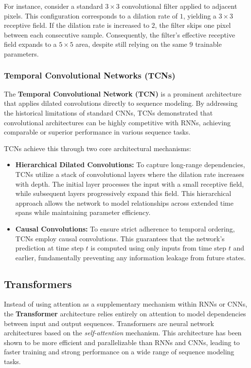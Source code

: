 For instance, consider a standard $3 \times 3$ convolutional filter applied to adjacent pixels. This configuration corresponds to a dilation rate of $1$, yielding a $3 \times 3$ receptive field. 
If the dilation rate is increased to $2$, the filter skips one pixel between each consecutive sample. Consequently, the filter's effective receptive field expands to a $5 \times 5$ area, despite still relying on the same $9$ trainable parameters.

\subsubsection{Temporal Convolutional Networks (TCNs)}
The \textbf{Temporal Convolutional Network (TCN)} is a prominent architecture that applies dilated convolutions directly to sequence modeling. 
By addressing the historical limitations of standard CNNs, TCNs demonstrated that convolutional architectures can be highly competitive with RNNs, achieving comparable or superior performance in various sequence tasks.

TCNs achieve this through two core architectural mechanisms:
\begin{itemize}
    \item \textbf{Hierarchical Dilated Convolutions:} To capture long-range dependencies, TCNs utilize a stack of convolutional layers where the dilation rate increases with depth. The initial layer processes the input with a small receptive field, while subsequent layers progressively expand this field. This hierarchical approach allows the network to model relationships across extended time spans while maintaining parameter efficiency.
    \item \textbf{Causal Convolutions:} To ensure strict adherence to temporal ordering, TCNs employ causal convolutions. This guarantees that the network's prediction at time step $t$ is computed using only inputs from time step $t$ and earlier, fundamentally preventing any information leakage from future states.
\end{itemize}

\subsection{Transformers}
Instead of using attention as a supplementary mechanism within RNNs or CNNs, the \textbf{Transformer} architecture relies entirely on attention to model dependencies between input and output sequences.
Transformers are neural network architectures based on the \textit{self-attention} mechanism.
This architecture has been shown to be more efficient and parallelizable than RNNs and CNNs, leading to faster training and strong performance on a wide range of sequence modeling tasks.

